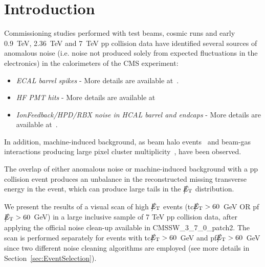 \section{Introduction}

Commissioning studies performed with test beams, cosmic runs and 
early 0.9~TeV, 2.36~TeV and 7~TeV pp 
collision data have identified several sources of anomalous noise 
(i.e. noise not produced solely from expected fluctuations in the electronics)
in the calorimeters of the CMS experiment:
\begin{itemize}
\item {\it ECAL barrel spikes} - More details are available at~\cite{ECALAt7TeV}.

\item {\it HF PMT hits} - More details are available at~\cite{Chatrchyan:1225105,HFDN}

\item {\it IonFeedback/HPD/RBX noise in HCAL barrel and endcaps} - More details are available at~\cite{Chatrchyan:1225105,HCALWGNOTE}.
\end{itemize}
In addition, machine-induced background, as beam halo events~\cite{BEAMHALONOTE} 
and beam-gas interactions producing large pixel cluster multiplicity~\cite{TRKPAS2010}, have been observed. 

The overlap of either anomalous noise or machine-induced background 
with a pp collision event produces an unbalance in 
the reconstructed missing transverse energy in the event, which can produce 
large tails in the $\big\slash\hspace{-1.6ex}{E_\text{T}}$ distribution. 

We present the results of a visual scan of high $\big\slash\hspace{-1.6ex}{E_\text{T}}$ events 
(tc$\big\slash\hspace{-1.6ex}{E_\text{T}}>60$~GeV OR pf$\big\slash\hspace{-1.6ex}{E_\text{T}}>60$~GeV) in a large inclusive sample of 7 TeV pp collision data, 
after applying the official noise clean-up available in CMSSW\_3\_7\_0\_patch2.
The scan is performed separately for events with tc$\big\slash\hspace{-1.6ex}{E_\text{T}}>60$~GeV and pf$\big\slash\hspace{-1.6ex}{E_\text{T}}>60$~GeV
since two different noise cleaning algorithms are employed (see more details in Section~\ref{sec:EventSelection}).

